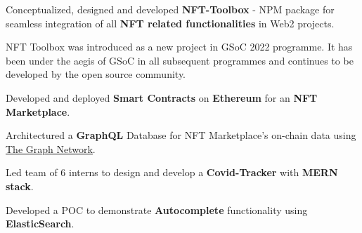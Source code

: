 \documentclass[]{deedy-resume-openfont}
\begin{document}
\begin{tightemize}
\item Conceptualized, designed and developed \textbf{NFT-Toolbox} - NPM package for seamless integration of all \textbf{NFT related functionalities} in Web2 projects.
\item NFT Toolbox was introduced as a new project in GSoC 2022 programme. It has been under the aegis of GSoC in all subsequent programmes and continues to be developed by the open source community.
\end{tightemize}
\sectionsep

\begin{tightemize}

\item Developed and deployed \textbf{Smart Contracts} on \textbf{Ethereum} for an \textbf{NFT Marketplace}.

\item Architectured a \textbf{GraphQL} Database for NFT Marketplace's on-chain data using \href{https://thegraph.com/docs/en/network/overview/}{\underline{The Graph Network}}.

\end{tightemize}
\sectionsep

\begin{tightemize}
\item Led team of 6 interns to design and develop a {\bf Covid-Tracker} with {\bf MERN stack}.
\item Developed a POC to demonstrate {\bf Autocomplete} functionality using {\bf ElasticSearch}.
\end{tightemize}
\sectionsep
\end{document}
